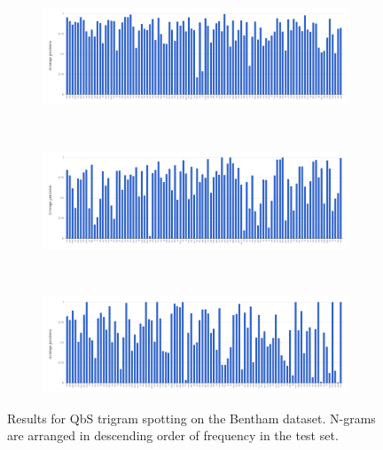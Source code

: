 \documentclass[ms,electronic,twosidetoc,letterpaper,chaptercenter,parttop,lof,lot]{byumsphd}
\begin{document}
\begin{figure}
\centering
\begin{subfigure}{.99\textwidth}
  \centering
  \includegraphics[width=.99\linewidth]{benthamTri1Spot}
  \label{fig:benthamTri1Spot}
\end{subfigure}
\\
\begin{subfigure}{.99\textwidth}
  \centering
  \includegraphics[width=.99\linewidth]{benthamTri2Spot}
  \label{fig:benthamTri2Spot}
\end{subfigure}
\\
\begin{subfigure}{.99\textwidth}
  \centering
  \includegraphics[width=.99\linewidth]{benthamTri3Spot}
  \label{fig:benthamTri3Spot}
\end{subfigure}
\caption{Results for QbS trigram spotting on the Bentham dataset. N-grams are arranged in descending order of frequency in the test set.}
\label{fig:benthamsub2}
\end{figure}
\end{document}

